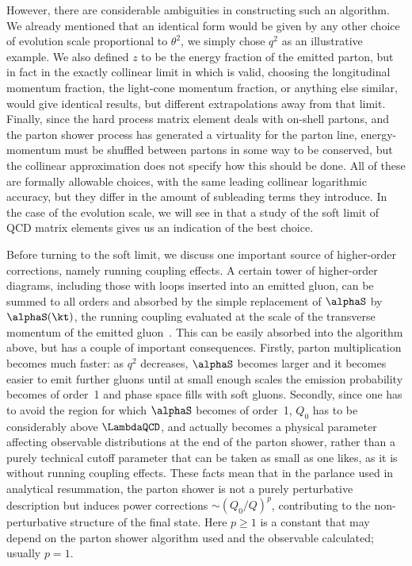 However, there are considerable ambiguities in constructing such an
algorithm.  We already mentioned that an identical form would be given
by any other choice of evolution scale proportional to $\theta^2$, we
simply chose $q^2$ as an illustrative example.  We also defined $z$ to
be the energy fraction of the emitted parton, but in fact in the exactly
collinear limit in which  is valid, choosing the
longitudinal momentum fraction, the light-cone momentum fraction, or
anything else similar, would give identical results, but different
extrapolations away from that limit.  Finally, since the hard process
matrix element deals with on-shell partons, and the parton shower
process has generated a virtuality for the parton line, energy-momentum
must be shuffled between partons in some way to be conserved, but the
collinear approximation does not specify how this should be done. All
of these are formally allowable choices, with the same leading
collinear logarithmic accuracy, but they differ in the amount of
subleading terms they introduce.  In the case of the evolution scale,
we will see in  that a study of the
soft limit of QCD matrix elements gives us an indication of the best
choice.

Before turning to the soft limit, we discuss one important source of
higher-order corrections, namely running coupling effects.  A certain
tower of higher-order diagrams, including those with loops inserted into
an emitted gluon, can be summed to all orders and absorbed by the
simple replacement of $\alphaS$ by $\alphaS(\kt)$, the running
coupling evaluated at the scale of the transverse momentum of the
emitted gluon~\cite{Amati:1980ch}.  This can be easily absorbed into the
algorithm above,
but has a couple of important consequences.  Firstly, parton
multiplication becomes much faster: as $q^2$ decreases, $\alphaS$
becomes larger and it becomes easier to emit further gluons until at
small enough scales the emission probability becomes of order~1 and
phase space fills with soft gluons.  Secondly, since one has to avoid
the region for which $\alphaS$ becomes of order~1, $Q_0$ has to be
considerably above $\LambdaQCD$, and actually becomes a physical
parameter affecting observable distributions at the end of the parton
shower, rather than a purely technical cutoff parameter that can be
taken as small as one likes, as it is without running coupling effects.
These facts mean that in the parlance used in analytical resummation,
the parton shower is not a purely perturbative description but induces
power corrections $\sim(Q_0/Q)^p$, contributing to the non-perturbative
structure of the final state. Here $p\ge1$ is a constant that may depend on
the parton shower algorithm used and the observable calculated; usually
$p=1$.

